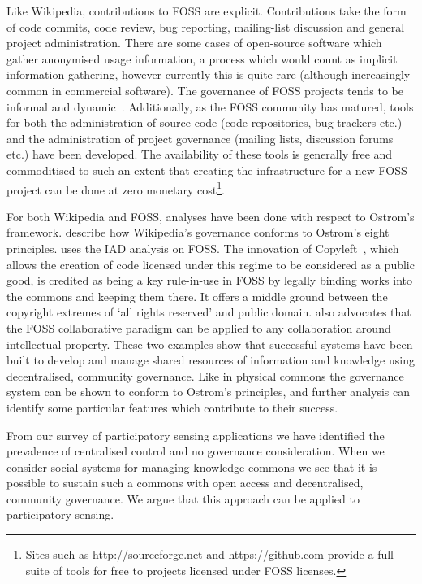 Like Wikipedia, contributions to \ac{FOSS} are explicit. Contributions take the form of code commits, code review, bug reporting, mailing-list discussion and general project administration. 
There are some cases of open-source software which gather anonymised usage information, a process which would count as implicit information gathering, however currently this is quite rare (although increasingly common in commercial software). 
The governance of \ac{FOSS} projects tends to be informal and dynamic~\citep{Schweik2007}. 
Additionally, as the \ac{FOSS} community has matured, tools for both the administration of source code (code repositories, bug trackers etc.) and the administration of project governance (mailing lists, discussion forums etc.) have been developed. 
The availability of these tools is generally free and commoditised to such an extent that creating the infrastructure for a new \ac{FOSS} project can be done at zero monetary cost\footnote{Sites such as http://sourceforge.net and https://github.com provide a full suite of tools for free to projects licensed under \ac{FOSS} licenses.}.

For both Wikipedia and \ac{FOSS}, analyses have been done with respect to Ostrom's framework. 
 describe how Wikipedia's governance conforms to Ostrom's eight principles. 
 uses the \ac{IAD} analysis on \ac{FOSS}. The innovation of Copyleft~\citep{Stallman1999}, which allows the creation of code licensed under this regime to be considered as a public good, is credited as being a key rule-in-use in \ac{FOSS} by legally binding works into the commons and keeping them there. 
It offers a middle ground between the copyright extremes of `all rights reserved' and public domain. 
 also advocates that the \ac{FOSS} collaborative paradigm can be applied to any collaboration around intellectual property. 
These two examples show that successful systems have been built to develop and manage shared resources of information and knowledge using decentralised, community governance. 
Like in physical commons the governance system can be shown to conform to Ostrom's principles, and further analysis can identify some particular features which contribute to their success.

From our survey of participatory sensing applications we have identified the
prevalence of centralised control and no governance consideration. When we
consider social systems for managing knowledge commons we see that it is
possible to sustain such a commons with open access and decentralised,
community governance. We argue that this approach can be applied to
participatory sensing.

